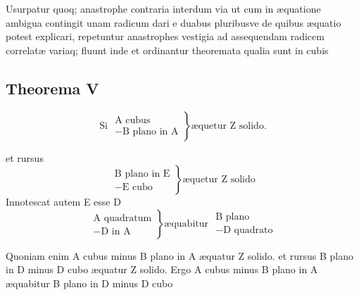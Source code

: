\documentclass[11pt,a4paper]{article}
\begin{document}
Usurpatur quoq; anastrophe contraria interdum via ut cum in æquatione ambigua contingit unam radicum dari e duabus pluribusve de quibus æquatio potest explicari, repetuntur anastrophes vestigia ad assequendam radicem correlatæ variaq; fluunt inde et ordinantur theoremata qualia sunt in cubis

\subsection*{Theorema V}

\[ \text{Si } \left.\begin{array}{l} \text{A cubus} \\ -\text{B plano in A} \end{array}\right\} \text{æquetur Z solido.} \]


et rursus
\[ \left.\begin{array}{l} \text{B plano in E} \\ -\text{E cubo} \end{array}\right\} \text{æquetur Z solido} \]
Innotescat autem E esse D
\[ \left.\begin{array}{l} \text{A quadratum} \\ -\text{D in A} \end{array}\right\} \text{æquabitur } \begin{array}{l} \text{B plano} \\ -\text{D quadrato} \end{array} \]

Quoniam enim A cubus minus B plano in A æquatur Z solido. et rursus B plano in D minus D cubo æquatur Z solido. Ergo A cubus minus B plano in A æquabitur B plano in D minus D cubo
\end{document}
